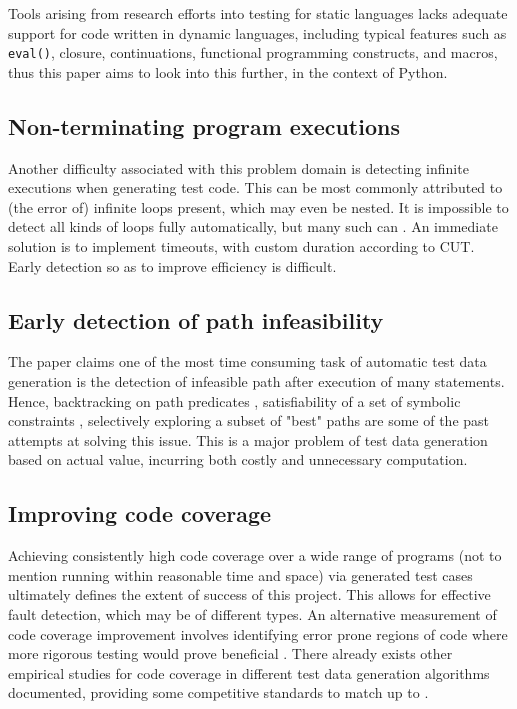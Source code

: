 \documentclass{icldt}
\numberwithin{equation}{section}       %
\begin{document}
{Tools arising from research efforts into testing for static languages lacks adequate support for code written in dynamic languages, including typical features such as \texttt{eval()}, closure, continuations, functional programming constructs, and macros, thus this paper aims to look into this further, in the context of Python.
\subsection{Non-terminating program executions}
Another difficulty associated with this problem domain is detecting infinite executions when generating test code. This can be most commonly attributed to (the error of) infinite loops present, which may even be nested. It is impossible to detect all kinds of loops fully automatically, but many such can \cite{Tahbildar}. An immediate solution is to implement timeouts, with custom duration according to CUT. Early detection so as to improve efficiency is difficult.
\subsection{Early detection of path infeasibility}
The paper \cite{Tahbildar} claims one of the most time consuming task of automatic test data generation is the detection of infeasible path after execution of many statements. Hence, backtracking on path predicates \cite{Korel1990}, satisfiability of a set of symbolic constraints \cite{ZhangW01}, selectively exploring a subset of "best" paths \cite{Prather1987} are some of the past attempts at solving this issue. This is a major problem of test data generation based on actual value, incurring both costly and unnecessary computation.
\subsection{Improving code coverage}
Achieving consistently high code coverage over a wide range of programs (not to mention running within reasonable time and space) via generated test cases ultimately defines the extent of success of this project. This allows for effective fault detection, which may be of different types. An alternative measurement of code coverage improvement involves identifying error prone regions of code where more rigorous testing would prove beneficial \cite{Ntafos1988} \cite{InceDC1987}. There already exists other empirical studies for code coverage in different test data generation algorithms documented, providing some competitive standards to match up to \cite{Han2008} \cite{Rothermel99testcase} \cite{Lakhotia2009}.
}
\end{document}
